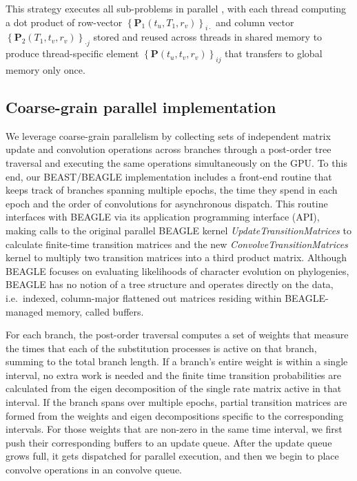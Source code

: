 This strategy executes all sub-problems in parallel%
, with each thread computing a dot product of row-vector  
$\left\{ \mathbf{P}_{1}(t_{u},T_1,r_{v})\right\} _{i\cdot}$  
and column vector 
$\left\{ \mathbf{P}_{2}(T_1,t_{v},r_{v})\right\} _{\cdot j}$ 
stored and reused across threads in shared memory to produce thread-specific element 
$\left\{ \mathbf{P}(t_{u},t_{v},r_{v})\right\} _{ij}$ 
that transfers to global memory only once. 

\subsection{Coarse-grain parallel implementation}

We leverage coarse-grain parallelism by collecting sets of independent matrix update and convolution operations across branches through a post-order tree traversal and executing the same operations simultaneously on the GPU.
To this end, our BEAST/BEAGLE implementation includes a front-end routine that keeps track of branches spanning multiple epochs, the time they spend in each epoch and the order of convolutions for asynchronous dispatch.
This routine interfaces with BEAGLE via its application programming interface (API), making calls to the original parallel BEAGLE kernel \emph{UpdateTransitionMatrices} to calculate finite-time transition matrices and the new \emph{ConvolveTransitionMatrices} kernel to multiply two transition matrices into a third product matrix.
%
Although BEAGLE focuses on evaluating likelihoods of character evolution on phylogenies, BEAGLE has no notion of a tree structure and operates directly on the data, i.e.~indexed, column-major flattened out matrices residing within BEAGLE-managed memory, called buffers.
%
\par
For each branch, the post-order traversal computes a set of weights that measure the times that each of the substitution processes is active on that branch, summing to the total branch length. 
If a branch's entire weight is within a single interval, no extra work is needed and the finite time transition probabilities are calculated from the eigen decomposition of the single rate matrix active in that interval.
If the branch spans over multiple epochs, partial transition matrices are formed from the weights and eigen decompositions specific to the corresponding intervals.
For those weights that are non-zero in the same time interval, we first push their corresponding buffers to an update queue.  After the update queue grows full, it gets dispatched for parallel execution, and then we begin to place convolve operations in an convolve queue. 

